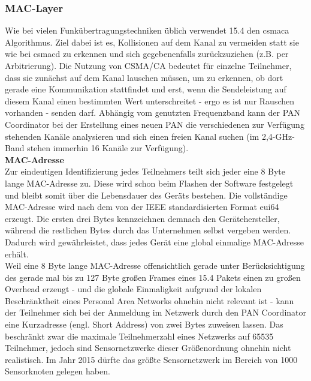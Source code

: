 \subsubsection{MAC-Layer}
Wie bei vielen Funkübertragungstechniken üblich verwendet 15.4 den \ac{csmaca} Algorithmus. Ziel dabei ist es, Kollisionen auf dem Kanal zu vermeiden statt sie wie bei \ac{csmacd} zu erkennen und sich gegebenenfalls zurückzuziehen (z.B. per Arbitrierung). Die Nutzung von CSMA/CA bedeutet für einzelne Teilnehmer, dass sie zunächst auf dem Kanal lauschen müssen, um zu erkennen, ob dort gerade eine Kommunikation stattfindet und erst, wenn die Sendeleistung auf diesem Kanal einen bestimmten Wert unterschreitet - ergo es ist nur Rauschen vorhanden - senden darf. Abhängig vom genutzten Frequenzband kann der PAN Coordinator bei der Erstellung eines neuen PAN die verschiedenen zur Verfügung stehenden Kanäle analysieren und sich einen freien Kanal suchen (im 2,4-GHz-Band stehen immerhin 16 Kanäle zur Verfügung). \\

\textbf{MAC-Adresse}\\
Zur eindeutigen Identifizierung jedes Teilnehmers teilt sich jeder eine 8 Byte lange MAC-Adresse zu. Diese wird schon beim Flashen der Software festgelegt und bleibt somit über die Lebensdauer des Geräts bestehen. Die vollständige MAC-Adresse wird nach dem von der IEEE standardisierten Format \ac{eui64} erzeugt. Die ersten drei Bytes kennzeichnen demnach den Gerätehersteller, während die restlichen Bytes durch das Unternehmen selbst vergeben werden. Dadurch wird gewährleistet, dass jedes Gerät eine global einmalige MAC-Adresse erhält. \\
Weil eine 8 Byte lange MAC-Adresse offensichtlich gerade unter Berücksichtigung des gerade mal bis zu 127 Byte großen Frames eines 15.4 Pakets einen zu großen Overhead erzeugt - und die globale Einmaligkeit aufgrund der lokalen Beschränktheit eines Personal Area Networks ohnehin nicht relevant ist - kann der Teilnehmer sich bei der Anmeldung im Netzwerk durch den PAN Coordinator eine Kurzadresse (engl. Short Address) von zwei Bytes zuweisen lassen. Das beschränkt zwar die maximale Teilnehmerzahl eines Netzwerks auf 65535 Teilnehmer, jedoch sind Sensornetzwerke dieser Größenordnung ohnehin nicht realistisch. Im Jahr 2015 dürfte das größte Sensornetzwerk im Bereich von 1000 Sensorknoten gelegen haben. \cite{schiessleiot} \\


